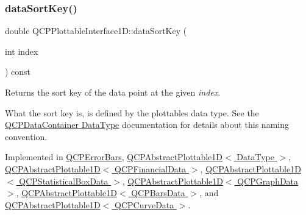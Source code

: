 \mbox{\label{classQCPPlottableInterface1D_afdc92f9f01e7e35f2e96b2ea9dc14ae7}} 
\subsubsection{\texorpdfstring{data\+Sort\+Key()}{dataSortKey()}}
{\footnotesize\ttfamily double Q\+C\+P\+Plottable\+Interface1\+D\+::data\+Sort\+Key (\begin{DoxyParamCaption}\item[{int}]{index }\end{DoxyParamCaption}) const\hspace{0.3cm}{\ttfamily [pure virtual]}}

Returns the sort key of the data point at the given {\itshape index}.

What the sort key is, is defined by the plottable\textquotesingle{}s data type. See the \hyperlink{classQCPDataContainer_qcpdatacontainer-datatype}{Q\+C\+P\+Data\+Container Data\+Type} documentation for details about this naming convention. 

Implemented in \hyperlink{classQCPErrorBars_a3000a036124880a90c629d124c1cd1e2}{Q\+C\+P\+Error\+Bars}, \hyperlink{classQCPAbstractPlottable1D_aa8277da921b009bce474437d50b4a2d8}{Q\+C\+P\+Abstract\+Plottable1\+D$<$ Data\+Type $>$}, \hyperlink{classQCPAbstractPlottable1D_aa8277da921b009bce474437d50b4a2d8}{Q\+C\+P\+Abstract\+Plottable1\+D$<$ Q\+C\+P\+Financial\+Data $>$}, \hyperlink{classQCPAbstractPlottable1D_aa8277da921b009bce474437d50b4a2d8}{Q\+C\+P\+Abstract\+Plottable1\+D$<$ Q\+C\+P\+Statistical\+Box\+Data $>$}, \hyperlink{classQCPAbstractPlottable1D_aa8277da921b009bce474437d50b4a2d8}{Q\+C\+P\+Abstract\+Plottable1\+D$<$ Q\+C\+P\+Graph\+Data $>$}, \hyperlink{classQCPAbstractPlottable1D_aa8277da921b009bce474437d50b4a2d8}{Q\+C\+P\+Abstract\+Plottable1\+D$<$ Q\+C\+P\+Bars\+Data $>$}, and \hyperlink{classQCPAbstractPlottable1D_aa8277da921b009bce474437d50b4a2d8}{Q\+C\+P\+Abstract\+Plottable1\+D$<$ Q\+C\+P\+Curve\+Data $>$}.

\mbox{\label{classQCPPlottableInterface1D_a9ca7fcf14d885a200879768679b19be9}} 
